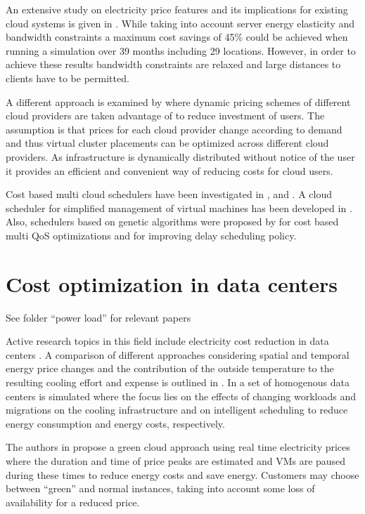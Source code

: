 An extensive study on electricity price features and its implications for existing cloud systems is given in \cite{qureshi2009cutting}. While taking into account server energy elasticity and bandwidth constraints a maximum cost savings of 45\% could be achieved when running a simulation over 39 months including 29 locations. However, in order to achieve these results bandwidth constraints are relaxed and large distances to clients have to be permitted. 

A different approach is examined by \cite{simarro2011dynamic} where dynamic pricing schemes of different cloud providers are taken advantage of to reduce investment of users. The assumption is that prices for each cloud provider change according to demand and thus virtual cluster placements can be optimized across different cloud providers. As infrastructure is dynamically distributed without notice of the user it provides an efficient and convenient way of reducing costs for cloud users. 

Cost based multi cloud schedulers have been investigated in \cite{guler2013cutting}, \cite{le2009cost} and \cite{tordsson2012cloud}. 
A cloud scheduler for simplified management of virtual machines has been developed in \cite{armstrong2010cloud}. 
Also, schedulers based on genetic algorithms were proposed by \cite{dutta2011genetic} for cost based multi QoS optimizations and \cite{ge2010ga} for improving delay scheduling policy. 


\section{Cost optimization in data centers}


See folder "`power load"' for relevant papers


Active research topics in this field include electricity cost reduction in data centers \cite{guler2013cutting, le2011reducing}. A comparison of different approaches considering spatial and temporal energy price changes and the contribution of the outside temperature to the resulting cooling effort and expense is outlined in \cite{guler2013cutting}. In \cite{le2011reducing} a set of homogenous data centers is simulated where the focus lies on the effects of changing workloads and migrations on the cooling infrastructure and on intelligent scheduling to reduce energy consumption and energy costs, respectively. 

The authors in \cite{lucanin2013take} propose a green cloud approach using real time electricity prices where the duration and time of price peaks are estimated and VMs are paused during these times to reduce energy costs and save energy. Customers may choose between ``green'' and normal instances, taking into account some loss of availability for a reduced price. 



